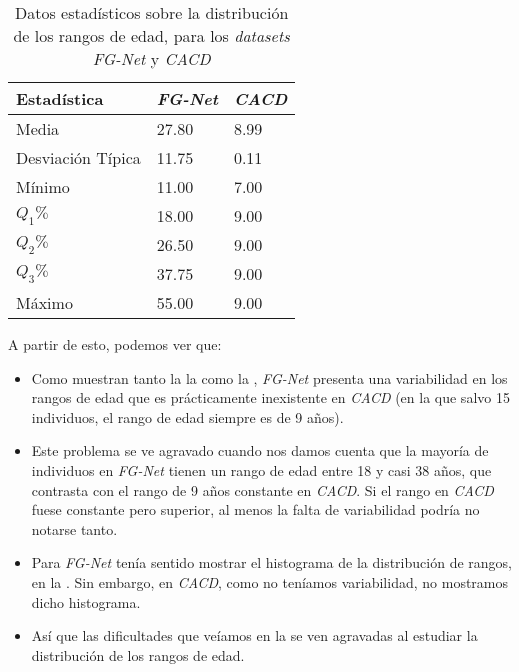 \begin{table}[!hbtp]
\centering
\begin{tabular}{|l|l|l|}
    \hline
    \textbf{Estadística} & \textbf{\textit{FG-Net}} & \textbf{\textit{CACD}} \\
    \hline

    Media             & 27.80 & 8.99 \\
    Desviación Típica & 11.75 & 0.11 \\
    Mínimo            & 11.00 & 7.00 \\
    $Q_1 \%$          & 18.00 & 9.00 \\
    $Q_2 \%$          & 26.50 & 9.00 \\
    $Q_3 \%$          & 37.75 & 9.00 \\
    Máximo            & 55.00 & 9.00 \\

    \hline

\end{tabular}
\caption{Datos estadísticos sobre la distribución de los rangos de edad, para los \textit{datasets} \textit{FG-Net} y \textit{CACD}}
    \label{table:conjunta_fgnet_estadisticas_rangos_edad}
\end{table}

A partir de esto, podemos ver que:

\begin{itemize}
    \item Como muestran tanto la la  como la , \textit{FG-Net} presenta una variabilidad en los rangos de edad que es prácticamente inexistente en \textit{CACD} (en la que salvo 15 individuos, el rango de edad siempre es de 9 años).
    \item Este problema se ve agravado cuando nos damos cuenta que la mayoría de individuos en \textit{FG-Net} tienen un rango de edad entre 18 y casi 38 años, que contrasta con el rango de 9 años constante en \textit{CACD}. Si el rango en \textit{CACD} fuese constante pero superior, al menos la falta de variabilidad podría no notarse tanto.
    \item Para \textit{FG-Net} tenía sentido mostrar el histograma de la distribución de rangos, en la . Sin embargo, en \textit{CACD}, como no teníamos variabilidad, no mostramos dicho histograma.
    \item Así que las dificultades que veíamos en la  se ven agravadas al estudiar la distribución de los rangos de edad.
\end{itemize}

